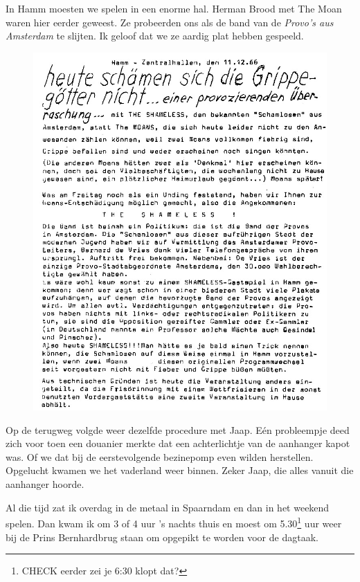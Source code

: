 \documentclass[12pt,twoside, openright]{memoir}
\begin{document}
In Hamm moesten we spelen in een enorme hal. Herman Brood met The Moan waren hier eerder geweest. Ze probeerden ons als de band van de \emph{Provo’s aus Amsterdam} te slijten. Ik geloof dat we ze aardig plat hebben gespeeld.

\begin{figure}
\includegraphics[width=\textwidth]{img/ch30/schamensich}
\end{figure}

Op de terugweg volgde weer dezelfde procedure met Jaap. Eén probleempje deed zich voor toen een douanier merkte dat een achterlichtje van de aanhanger kapot was. Of we dat bij de eerstevolgende bezinepomp even wilden herstellen. Opgelucht kwamen we het vaderland weer binnen. Zeker Jaap, die alles vanuit die aanhanger hoorde.

Al die tijd zat ik overdag in de metaal in Spaarndam en dan in het weekend spelen. Dan kwam ik om 3 of 4 uur ’s nachts thuis en moest om 5.30\footnote{CHECK eerder zei je 6:30 klopt dat?} uur weer bij de Prins Bernhardbrug staan om opgepikt te worden voor de dagtaak. 
\end{document}
